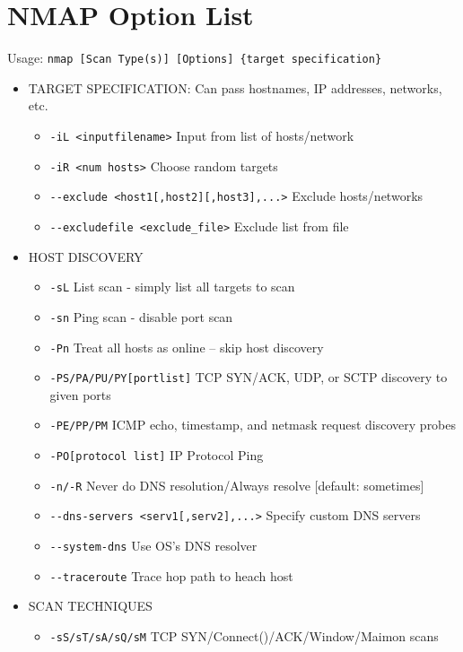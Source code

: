 \section{NMAP Option List}

Usage: \verb|nmap [Scan Type(s)] [Options] {target specification}|

\begin{itemize}
    \item TARGET SPECIFICATION: Can pass hostnames, IP addresses, networks, etc.
    \begin{itemize}
        \item \verb|-iL <inputfilename>| Input from list of hosts/network
        \item \verb|-iR <num hosts>| Choose random targets
        \item  \verb|--exclude <host1[,host2][,host3],...>| Exclude hosts/networks
        \item \verb|--excludefile <exclude_file>| Exclude list from file
    \end{itemize}
    \item HOST DISCOVERY
    \begin{itemize}
        \item \verb|-sL| List scan - simply list all targets to scan
        \item \verb|-sn| Ping scan - disable port scan
        \item \verb|-Pn| Treat all hosts as online -- skip host discovery
        \item \verb|-PS/PA/PU/PY[portlist]| TCP SYN/ACK, UDP, or SCTP discovery to given ports
        \item \verb|-PE/PP/PM| ICMP echo, timestamp, and netmask request discovery probes
        \item \verb|-PO[protocol list]| IP Protocol Ping
        \item \verb|-n/-R| Never do DNS resolution/Always resolve [default: sometimes]
        \item \verb|--dns-servers <serv1[,serv2],...>| Specify custom DNS servers
        \item \verb|--system-dns| Use OS's DNS resolver
        \item \verb|--traceroute| Trace hop path to heach host
    \end{itemize}
    \item SCAN TECHNIQUES
    \begin{itemize}
        \item \verb|-sS/sT/sA/sQ/sM| TCP SYN/Connect()/ACK/Window/Maimon scans

\end{itemize}
\end{itemize}
